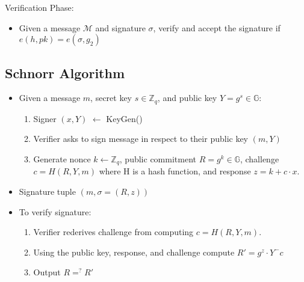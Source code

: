\documentclass[12pt]{article}
\begin{document}
Verification Phase:
\begin{itemize}
    \item Given a message \( \mathcal{M} \) and signature \( \sigma \), verify and accept the signature if 
    \( e(h, pk) = e(\sigma, g_2) \)
\end{itemize}

\subsection{Schnorr Algorithm}\label{subsec:schnorr}

\begin{itemize}
    \item Given a message \(m\), secret key \(s \in \mathbb{Z}_q\), and public key \(Y = g^s \in \mathbb{G}\):
    \begin{enumerate}
        \item Signer \( (x, Y)\) \( \leftarrow\) KeyGen()
        \item Verifier asks to sign message in respect to their public key \( (m, Y)\)
        \item Generate nonce \( k \leftarrow \mathbb{Z}_q \), public commitment \(R = g^k \in \mathbb{G}\), challenge \(c =H(R, Y, m)\) where H is a hash function, and response \(z =k+c \cdot x\).
    \end{enumerate}
    \item Signature tuple \( (m, \sigma = (R, z))\)
    \item To verify signature:
    \begin{enumerate}
        \item Verifier rederives challenge from computing \(c= H( R, Y, m)\).
        \item Using the public key, response, and challenge compute \( R'= g^z \cdot Y^-c\) 
        \item Output \( R =^? R'\)
    \end{enumerate}
\end{itemize}
\end{document}

